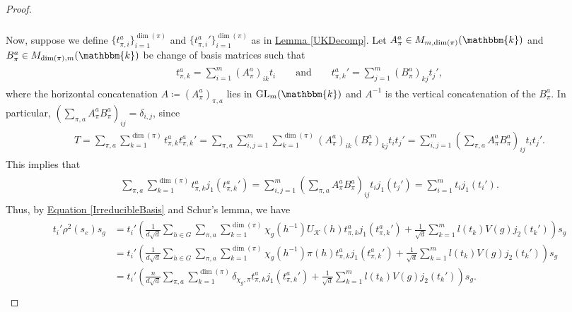 \begin{proof}
\begin{align*}
\begin{split}
\end{split}
\end{align*}
\noindent Now, suppose we define $\{t_{\pi,i}^a\}_{i=1}^{\dim(\pi)}$ and $\{{t_{\pi,i}^a}'\}_{i=1}^{\dim(\pi)}$ as in \hyperref[UKDecomp]{Lemma \ref*{UKDecomp}}. Let $A_\pi^a \in M_{m,\dim(\pi)}(\mathbbm{k})$ and $B_\pi^a \in M_{\dim(\pi),m}(\mathbbm{k})$ be change of basis matrices such that
\begin{align*}
\begin{split}
t_{\pi,k}^a = \sum_{i=1}^m (A_\pi^a)_{ik}t_i\qquad\text{and}\qquad {t_{\pi,k}^a}' = \sum_{j=1}^m (B_\pi^a)_{kj}t_j',
\end{split}
\end{align*}
\noindent where the horizontal concatenation $A \coloneqq (A_\pi^a)_{\pi,a}$ lies in $\textup{GL}_m(\mathbbm{k})$ and $A^{-1}$ is the vertical concatenation of the $B_\pi^a$. In particular, $(\sum_{\pi,a} A_\pi^a B_\pi^a)_{ij} = \delta_{i,j}$, since
\begin{align*}
\begin{split}
T = \sum_{\pi,a}\sum_{k=1}^{\dim(\pi)} t_{\pi,k}^a {t_{\pi,k}^a}' = \sum_{\pi,a}\sum_{i,j=1}^m\sum_{k=1}^{\dim(\pi)} (A_\pi^a)_{ik}(B_\pi^a)_{kj} t_i t_j' = \sum_{i,j=1}^m (\sum_{\pi,a} A_\pi^a B_\pi^a)_{ij} t_i t_j'.
\end{split}
\end{align*}
\noindent This implies that
\begin{align*}
\begin{split}
\sum_{\pi,a}\sum_{k=1}^{\dim(\pi)} t_{\pi,k}^a j_1({t_{\pi,k}^a}') = \sum_{i,j=1}^m (\sum_{\pi,a} A_\pi^a B_\pi^a)_{ij}t_i j_1(t_j') = \sum_{i=1}^m t_i j_1(t_i').
\end{split}
\end{align*} Thus, by \hyperref[IrreducibleBasis]{Equation \eqref*{IrreducibleBasis}} and Schur's lemma, we have
\begin{align*}
\begin{split}
t_i'\rho^2(s_e)s_g &= t_i'\left(\frac{1}{d\sqrt{d}}\sum_{h \in G}\sum_{\pi,a}\sum_{k=1}^{\dim(\pi)}\chi_g(h^{-1})U_\mathcal{K}(h)t_{\pi,k}^a j_1({t_{\pi,k}^a}') + \frac{1}{\sqrt{d}}\sum_{k=1}^m l(t_k)V(g)j_2(t_k')\right)s_g\\
&= t_i'\left(\frac{1}{d\sqrt{d}}\sum_{h \in G}\sum_{\pi,a}\sum_{k=1}^{\dim(\pi)}\chi_g(h^{-1})\pi(h)t_{\pi,k}^a j_1({t_{\pi,k}^a}') + \frac{1}{\sqrt{d}}\sum_{k=1}^m l(t_k)V(g)j_2(t_k')\right)s_g\\
&= t_i'\left(\frac{n}{d\sqrt{d}}\sum_{\pi,a}\sum_{k=1}^{\dim(\pi)}\delta_{\chi_g,\pi}t_{\pi,k}^a j_1({t_{\pi,k}^a}') + \frac{1}{\sqrt{d}}\sum_{k=1}^m l(t_k)V(g)j_2(t_k')\right)s_g.\\

\end{split}
\end{align*}
\end{proof}
